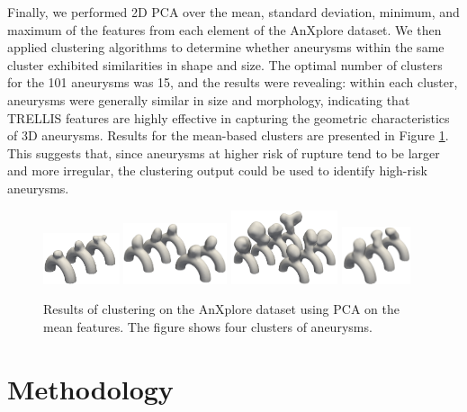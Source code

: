 \documentclass[%
 reprint,
 amsmath,amssymb,
 aps,
 floatfix,
 nofootinbib,
]{revtex4-2}
\begin{document}
Finally, we performed 2D PCA over the mean, standard deviation, minimum, and maximum of the features from each element of the AnXplore dataset. We then applied clustering algorithms to determine whether aneurysms within the same cluster exhibited similarities in shape and size. The optimal number of clusters for the 101 aneurysms was 15, and the results were revealing: within each cluster, aneurysms were generally similar in size and morphology, indicating that TRELLIS features are highly effective in capturing the geometric characteristics of 3D aneurysms. Results for the mean-based clusters are presented in Figure \ref{fig:clustering}. This suggests that, since aneurysms at higher risk of rupture tend to be larger and more irregular, the clustering output could be used to identify high-risk aneurysms. 

\begin{figure}[h!]
  \centering
  \includegraphics[width=0.20\textwidth]{cluster_11.png}
  \includegraphics[width=0.27\textwidth]{cluster_13.png}
  \includegraphics[width=0.28\textwidth]{cluster_14.png}
  \includegraphics[width=0.18\textwidth]{cluster_6.png}
  \caption{Results of clustering on the AnXplore dataset using PCA on the mean features. The figure shows four clusters of aneurysms.}
  \label{fig:clustering}
\end{figure}



\section{Methodology} \label{METHODOLOGY}
\end{document}
